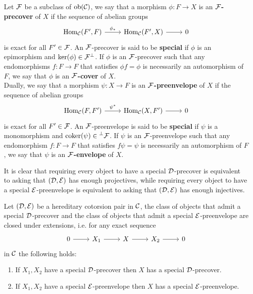 \begin{definition}
    Let $\mathcal{F}$ be a subclass of $\mathrm{ob}(\mathcal{C})$, we say that a morphism $\phi \colon F \longrightarrow X$ is an $\mathcal{F}$\textbf{-precover} of $X$ if the sequence of abelian groups
    \[\begin{tikzcd}
        {\Hom_\C(F',F)} & {\Hom_\C(F',X)} & 0
        \arrow["{\phi_*}", from=1-1, to=1-2]
        \arrow[from=1-2, to=1-3]
    \end{tikzcd}\]
    is exact for all $F' \in \mathcal{F}$. An $\mathcal{F}$-precover is said to be \textbf{special} if $\phi$ is an epimorphism and $\ker(\phi) \in {\mathcal{F}}^\perp$. If $\phi$ is an $\mathcal{F}$-precover such that any endomorphisms $f\colon F \longrightarrow F$ that satisfies $\phi f = \phi$ is necessarily an automorphism of $F$, we say that $\phi$ is an $\mathcal{F}$\textbf{-cover} of $X$. \\
    Dually, we say that a morphism $\psi \colon X \longrightarrow F$ is an $\mathcal{F}$\textbf{-preenvelope} of $X$ if the sequence of abelian groups
    \[\begin{tikzcd}
        {\Hom_\C(F,F')} & {\Hom_\C(X,F')} & 0
        \arrow["{\psi^*}", from=1-1, to=1-2]
        \arrow[from=1-2, to=1-3]
    \end{tikzcd}\]
    is exact for all $F' \in \mathcal{F}$. An $\mathcal{F}$-preenvelope is said to be \textbf{special} if $\psi$ is a monomorphism and $\operatorname{coker}(\psi) \in \prescript{\perp}{}{\mathcal{F}}$. If $\psi$ is an $\mathcal{F}$-preenvelope such that any endomorphism $f\colon F \longrightarrow F$ that satisfies $f\psi  = \psi$ is necessarily an automorphism of $F$, we say that $\psi$ is an $\mathcal{F}$\textbf{-envelope} of $X$. \\
\end{definition}

It is clear that requiring every object to have a special $\mathcal{D}$-precover is equivalent to asking that $(\mathcal{D}, \mathcal{E})$ has enough projectives, while requiring every object to have a special $\mathcal{E}$-preenvelope is equivalent to asking that $(\mathcal{D}, \mathcal{E})$ has enough injectives.

\begin{lemma}
    \label{lem:cover-ext}
    Let $(\mathcal{D}, \mathcal{E})$ be a hereditary cotorsion pair in $\mathcal{C}$, the class of objects that admit a special $\mathcal{D}$-precover and the class of objects that admit a special $\mathcal{E}$-preenvelope are closed under extensions, i.e. for any exact sequence
    \[\begin{tikzcd}
        0 & {X_1} & X & {X_2} & 0
        \arrow[from=1-1, to=1-2]
        \arrow[from=1-2, to=1-3]
        \arrow[from=1-3, to=1-4]
        \arrow[from=1-4, to=1-5]
    \end{tikzcd}\]
    in $\mathcal{C}$ the following holds:
    \begin{enumerate}
        \itemsep0em 
        \item If $X_1, X_2$ have a special $\mathcal{D}$-precover then $X$ has a special $\mathcal{D}$-precover.
        \item If $X_1, X_2$ have a special $\mathcal{E}$-preenvelope then $X$ has a special $\mathcal{E}$-preenvelope.
    \end{enumerate}
\end{lemma}

